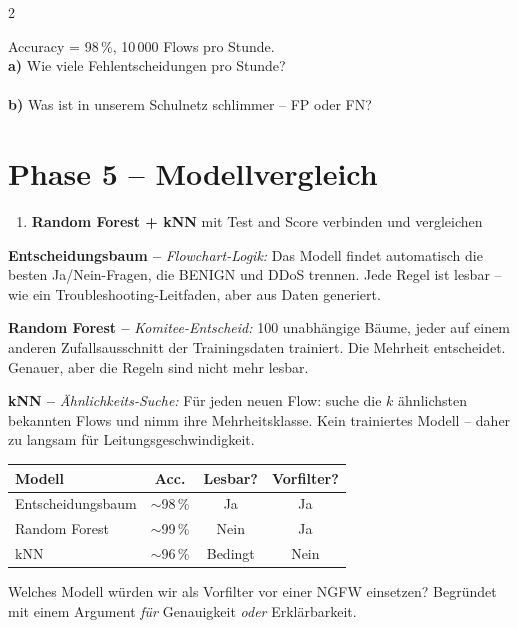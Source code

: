\documentclass[a4paper, 10pt]{article}
\newcommand{\uebung}[2]{%
  \begin{tcolorbox}[uebstyle, title={Übung #1}]%
  \small #2%
  \end{tcolorbox}%
}
\begin{document}
\begin{multicols}{2}
\uebung{4}{%
  Accuracy = 98\,\%, 10\,000 Flows pro Stunde.\\[2pt]
  \textbf{a)} Wie viele Fehlentscheidungen pro Stunde?\\[7pt]
  \dotfill\\[5pt]
  \textbf{b)} Was ist in unserem Schulnetz schlimmer – FP oder FN?\\[7pt]
  \dotfill
}

\section{Phase 5 – Modellvergleich}

\begin{enumerate}[start=9]
\item \textbf{Random Forest + kNN}
      mit Test and Score verbinden und vergleichen
\end{enumerate}

{\small
\textbf{Entscheidungsbaum –} \textit{Flowchart-Logik:}
Das Modell findet automatisch die besten Ja/Nein-Fragen,
die BENIGN und DDoS trennen. Jede Regel ist lesbar –
wie ein Troubleshooting-Leitfaden, aber aus Daten generiert.

\smallskip
\textbf{Random Forest –} \textit{Komitee-Entscheid:}
100 unabhängige Bäume, jeder auf einem anderen Zufalls\-ausschnitt
der Trainingsdaten trainiert. Die Mehrheit entscheidet.
Genauer, aber die Regeln sind nicht mehr lesbar.

\smallskip
\textbf{kNN –} \textit{Ähnlichkeits-Suche:}
Für jeden neuen Flow: suche die $k$ ähnlichsten bekannten Flows
und nimm ihre Mehrheitsklasse. Kein trainiertes Modell –
daher zu langsam für Leitungsgeschwindigkeit.
}

\smallskip
\begin{tabularx}{\linewidth}{@{}lccc@{}}
\toprule
\textbf{Modell} & \textbf{Acc.} & \textbf{Lesbar?} & \textbf{Vorfilter?}\\
\midrule
Entscheidungsbaum & $\sim$98\,\% & Ja & Ja\\
Random Forest     & $\sim$99\,\% & Nein & Ja\\
kNN               & $\sim$96\,\% & Bedingt & Nein\\
\bottomrule
\end{tabularx}

\uebung{5}{%
  Welches Modell würden wir als Vorfilter vor einer NGFW einsetzen?
  Begründet mit einem Argument
  \emph{für} Genauigkeit \emph{oder} Erklärbarkeit.\\[10pt]
  \dotfill\\[8pt]
  \dotfill
}


\end{multicols}
\end{document}
